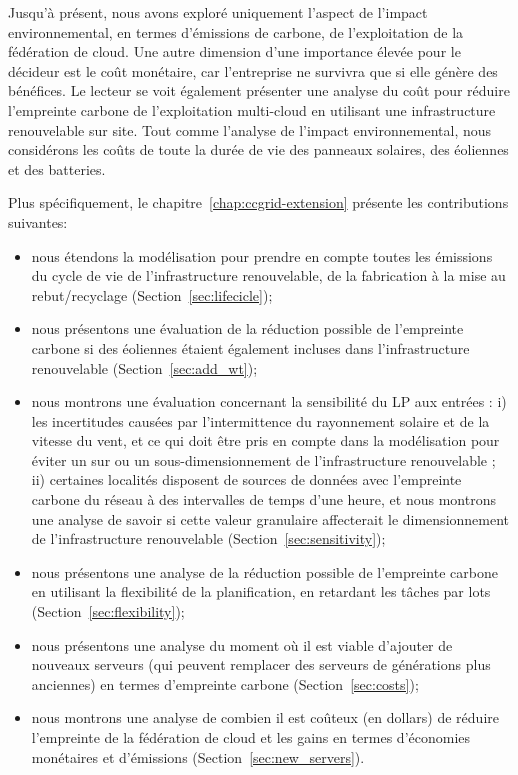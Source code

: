Jusqu'à présent, nous avons exploré uniquement l'aspect de l'impact environnemental, en termes d'émissions de carbone, de l'exploitation de la fédération de cloud. Une autre dimension d'une importance élevée pour le décideur est le coût monétaire, car l'entreprise ne survivra que si elle génère des bénéfices. Le lecteur se voit également présenter une analyse du coût pour réduire l'empreinte carbone de l'exploitation multi-cloud en utilisant une infrastructure renouvelable sur site. Tout comme l'analyse de l'impact environnemental, nous considérons les coûts de toute la durée de vie des panneaux solaires, des éoliennes et des batteries.

Plus spécifiquement, le chapitre~\ref{chap:ccgrid-extension} présente les contributions suivantes:

\begin{itemize}

\item nous étendons la modélisation pour prendre en compte toutes les émissions du cycle de vie de l'infrastructure renouvelable, de la fabrication à la mise au rebut/recyclage (Section~\ref{sec:lifecicle});
\item nous présentons une évaluation de la réduction possible de l'empreinte carbone si des éoliennes étaient également incluses dans l'infrastructure renouvelable (Section~\ref{sec:add_wt});
\item nous montrons une évaluation concernant la sensibilité du LP aux entrées : i) les incertitudes causées par l'intermittence du rayonnement solaire et de la vitesse du vent, et ce qui doit être pris en compte dans la modélisation pour éviter un sur ou un sous-dimensionnement de l'infrastructure renouvelable ; ii) certaines localités disposent de sources de données avec l'empreinte carbone du réseau à des intervalles de temps d'une heure, et nous montrons une analyse de savoir si cette valeur granulaire affecterait le dimensionnement de l'infrastructure renouvelable (Section~\ref{sec:sensitivity});
\item nous présentons une analyse de la réduction possible de l'empreinte carbone en utilisant la flexibilité de la planification, en retardant les tâches par lots (Section~\ref{sec:flexibility});
\item nous présentons une analyse du moment où il est viable d'ajouter de nouveaux serveurs (qui peuvent remplacer des serveurs de générations plus anciennes) en termes d'empreinte carbone (Section~\ref{sec:costs});
\item nous montrons une analyse de combien il est coûteux (en dollars) de réduire l'empreinte de la fédération de cloud et les gains en termes d'économies monétaires et d'émissions (Section~\ref{sec:new_servers}).
  
\end{itemize}


